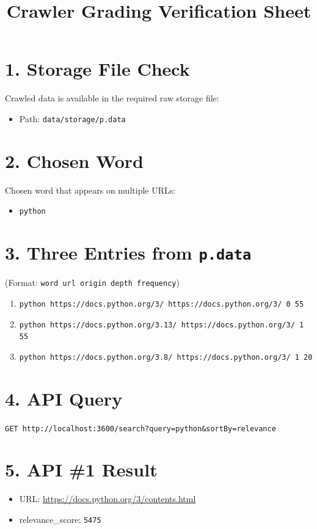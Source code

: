 \documentclass[11pt]{article}
\title{Crawler Grading Verification Sheet}
\author{}
\date{}
\begin{document}
\maketitle

\section*{1. Storage File Check}
Crawled data is available in the required raw storage file:
\begin{itemize}
  \item Path: \texttt{data/storage/p.data}
\end{itemize}

\section*{2. Chosen Word}
Chosen word that appears on multiple URLs:
\begin{itemize}
  \item \texttt{python}
\end{itemize}

\section*{3. Three Entries from \texttt{p.data}}
(Format: \texttt{word url origin depth frequency})
\begin{enumerate}[label=Entry \arabic*:]
  \item \texttt{python https://docs.python.org/3/ https://docs.python.org/3/ 0 55}
  \item \texttt{python https://docs.python.org/3.13/ https://docs.python.org/3/ 1 55}
  \item \texttt{python https://docs.python.org/3.8/ https://docs.python.org/3/ 1 20}
\end{enumerate}

\section*{4. API Query}
\texttt{GET http://localhost:3600/search?query=python\&sortBy=relevance}

\section*{5. API \#1 Result}
\begin{itemize}
  \item URL: \url{https://docs.python.org/3/contents.html}
  \item relevance\_score: \texttt{5475}
\end{itemize}
\end{document}
